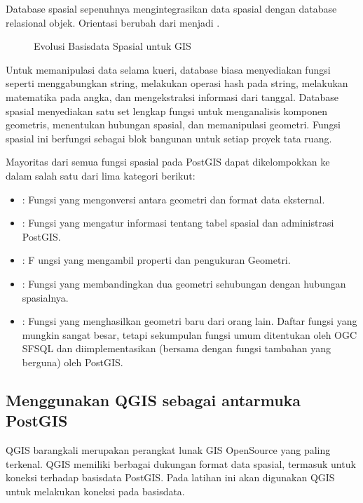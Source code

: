 \documentclass[letterpaper,10pt,english]{sphinxmanual}
\let\sphinxpxdimen\pdfpxdimen\else\newdimen\sphinxpxdimen
\begin{document}
Database spasial sepenuhnya mengintegrasikan data spasial dengan database relasional objek. Orientasi berubah dari  menjadi .

\begin{figure}[htbp]
\centering
\capstart

\noindent\sphinxincludegraphics[height=400\sphinxpxdimen]{{2020-12-03-07-15-37}.png}
\caption{Evolusi Basisdata Spasial untuk GIS}\label{\detokenize{sesi2/postgisquery:evolusi}}\end{figure}

Untuk memanipulasi data selama kueri, database biasa menyediakan fungsi seperti menggabungkan string, melakukan operasi hash pada string, melakukan matematika pada angka, dan mengekstraksi informasi dari tanggal. Database spasial menyediakan satu set lengkap fungsi untuk menganalisis komponen geometris, menentukan hubungan spasial, dan memanipulasi geometri. Fungsi spasial ini berfungsi sebagai blok bangunan untuk setiap proyek tata ruang.

Mayoritas dari semua fungsi spasial pada PostGIS dapat dikelompokkan ke dalam salah satu dari lima kategori berikut:
\begin{itemize}
\item {} 
: Fungsi yang mengonversi antara geometri dan format data eksternal.

\item {} 
: Fungsi yang mengatur informasi tentang tabel spasial dan administrasi PostGIS.

\item {} 
: F  ungsi yang mengambil properti dan pengukuran Geometri.

\item {} 
: Fungsi yang membandingkan dua geometri sehubungan dengan hubungan spasialnya.

\item {} 
: Fungsi yang menghasilkan geometri baru dari orang lain.
Daftar fungsi yang mungkin sangat besar, tetapi sekumpulan fungsi umum ditentukan oleh OGC SFSQL dan diimplementasikan (bersama dengan fungsi tambahan yang berguna) oleh PostGIS.

\end{itemize}


\subsection{Menggunakan QGIS sebagai antarmuka PostGIS}
\label{\detokenize{sesi2/postgisquery:menggunakan-qgis-sebagai-antarmuka-postgis}}
QGIS barangkali merupakan perangkat lunak GIS OpenSource yang paling terkenal. QGIS memiliki berbagai dukungan format data spasial, termasuk untuk koneksi terhadap basisdata PostGIS. Pada latihan ini akan digunakan QGIS untuk melakukan koneksi pada basisdata.
\end{document}
